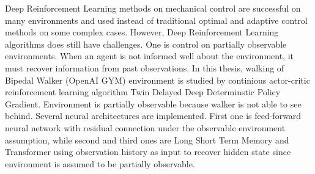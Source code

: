 Deep Reinforcement Learning methods on mechanical control are successful on many environments and used instead of traditional optimal and adaptive control methods on some complex cases. However, Deep Reinforcement Learning algorithms does still have challenges. One is control on partially observable environments. When an agent is not informed well about the environment, it must recover information from past observations. In this thesis, walking of Bipedal Walker (OpenAI GYM) environment is studied by continious actor-critic reinforcement learning algorithm Twin Delayed Deep Determinstic Policy Gradient. Environment is partially observable because walker is not able to see behind. Several neural architectures are implemented. First one is feed-forward neural network with residual connection under the observable environment assumption, while second and third ones are Long Short Term Memory and Transformer using observation history as input to recover hidden state since environment is assumed to be partially observable.



